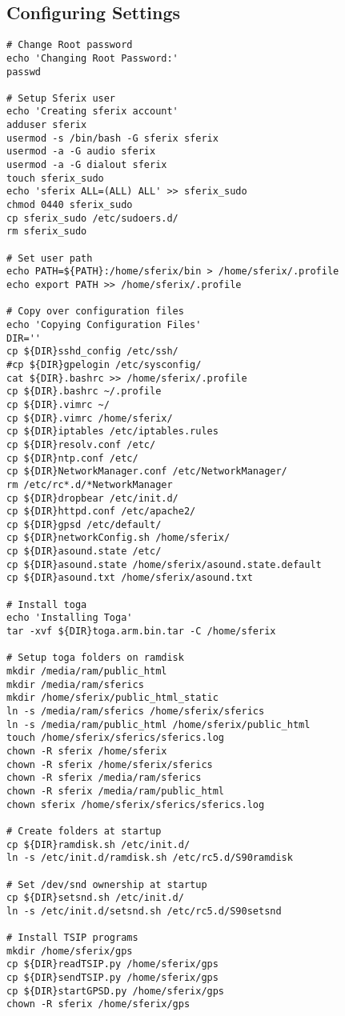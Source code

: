 \subsection{Configuring Settings}

\begin{verbatim}
# Change Root password
echo 'Changing Root Password:'
passwd

# Setup Sferix user
echo 'Creating sferix account'
adduser sferix
usermod -s /bin/bash -G sferix sferix
usermod -a -G audio sferix
usermod -a -G dialout sferix
touch sferix_sudo
echo 'sferix ALL=(ALL) ALL' >> sferix_sudo
chmod 0440 sferix_sudo
cp sferix_sudo /etc/sudoers.d/
rm sferix_sudo

# Set user path
echo PATH=${PATH}:/home/sferix/bin > /home/sferix/.profile
echo export PATH >> /home/sferix/.profile

# Copy over configuration files
echo 'Copying Configuration Files'
DIR=''
cp ${DIR}sshd_config /etc/ssh/
#cp ${DIR}gpelogin /etc/sysconfig/
cat ${DIR}.bashrc >> /home/sferix/.profile
cp ${DIR}.bashrc ~/.profile
cp ${DIR}.vimrc ~/
cp ${DIR}.vimrc /home/sferix/
cp ${DIR}iptables /etc/iptables.rules
cp ${DIR}resolv.conf /etc/
cp ${DIR}ntp.conf /etc/
cp ${DIR}NetworkManager.conf /etc/NetworkManager/
rm /etc/rc*.d/*NetworkManager
cp ${DIR}dropbear /etc/init.d/
cp ${DIR}httpd.conf /etc/apache2/
cp ${DIR}gpsd /etc/default/
cp ${DIR}networkConfig.sh /home/sferix/
cp ${DIR}asound.state /etc/
cp ${DIR}asound.state /home/sferix/asound.state.default
cp ${DIR}asound.txt /home/sferix/asound.txt

# Install toga
echo 'Installing Toga'
tar -xvf ${DIR}toga.arm.bin.tar -C /home/sferix

# Setup toga folders on ramdisk
mkdir /media/ram/public_html
mkdir /media/ram/sferics
mkdir /home/sferix/public_html_static
ln -s /media/ram/sferics /home/sferix/sferics
ln -s /media/ram/public_html /home/sferix/public_html
touch /home/sferix/sferics/sferics.log
chown -R sferix /home/sferix
chown -R sferix /home/sferix/sferics
chown -R sferix /media/ram/sferics
chown -R sferix /media/ram/public_html
chown sferix /home/sferix/sferics/sferics.log

# Create folders at startup
cp ${DIR}ramdisk.sh /etc/init.d/
ln -s /etc/init.d/ramdisk.sh /etc/rc5.d/S90ramdisk

# Set /dev/snd ownership at startup
cp ${DIR}setsnd.sh /etc/init.d/
ln -s /etc/init.d/setsnd.sh /etc/rc5.d/S90setsnd

# Install TSIP programs
mkdir /home/sferix/gps
cp ${DIR}readTSIP.py /home/sferix/gps
cp ${DIR}sendTSIP.py /home/sferix/gps
cp ${DIR}startGPSD.py /home/sferix/gps
chown -R sferix /home/sferix/gps


\end{verbatim}
